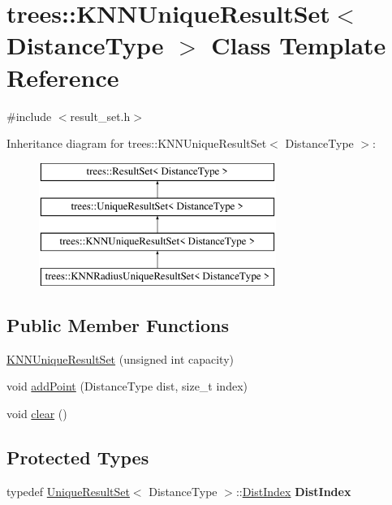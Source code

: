 \hypertarget{classtrees_1_1_k_n_n_unique_result_set}{}\section{trees\+:\+:K\+N\+N\+Unique\+Result\+Set$<$ Distance\+Type $>$ Class Template Reference}
\label{classtrees_1_1_k_n_n_unique_result_set}


{\ttfamily \#include $<$result\+\_\+set.\+h$>$}

Inheritance diagram for trees\+:\+:K\+N\+N\+Unique\+Result\+Set$<$ Distance\+Type $>$\+:\begin{figure}[H]
\begin{center}
\leavevmode
\includegraphics[height=4.000000cm]{classtrees_1_1_k_n_n_unique_result_set}
\end{center}
\end{figure}
\subsection*{Public Member Functions}
\begin{DoxyCompactItemize}
\item 
\hyperlink{classtrees_1_1_k_n_n_unique_result_set_a97620bc6b7febbe8c1885e7191fadf86}{K\+N\+N\+Unique\+Result\+Set} (unsigned int capacity)
\item 
void \hyperlink{classtrees_1_1_k_n_n_unique_result_set_af5525c7d03d3c2f37031b46207aec3a2}{add\+Point} (Distance\+Type dist, size\+\_\+t index)
\item 
void \hyperlink{classtrees_1_1_k_n_n_unique_result_set_aaa6184d20236d8ebe5facb2560751e88}{clear} ()
\end{DoxyCompactItemize}
\subsection*{Protected Types}
\begin{DoxyCompactItemize}
\item 
\mbox{\label{classtrees_1_1_k_n_n_unique_result_set_a37696fa83b61266a10aae88a74e534b4}} 
typedef \hyperlink{classtrees_1_1_unique_result_set}{Unique\+Result\+Set}$<$ Distance\+Type $>$\+::\hyperlink{structtrees_1_1_unique_result_set_1_1_dist_index}{Dist\+Index} {\bfseries Dist\+Index}
\end{DoxyCompactItemize}
